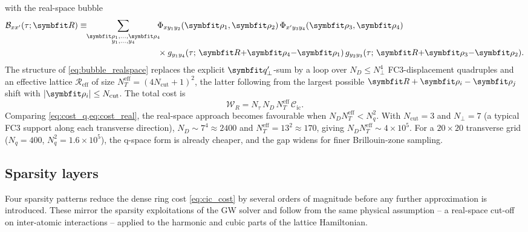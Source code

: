 with the real-space bubble
\begin{equation}\label{eq:bubble_realspace}
\begin{aligned}
  \mathcal{B}_{xx'}(\tau;\vR)
  \equiv
  \!\!\sum_{\substack{\vc{\rho}_1,\ldots,\vc{\rho}_4\\y_1,\ldots,y_4}}\!\!
  &\Phi_{xy_1y_2}(\vc\rho_1,\vc\rho_2)\,
   \Phi_{x'y_3y_4}(\vc\rho_3,\vc\rho_4)\\
  &\times g_{y_1y_4}(\tau;\,\vR{+}\vc\rho_4{-}\vc\rho_1)\,
          g_{y_2y_3}(\tau;\,\vR{+}\vc\rho_3{-}\vc\rho_2).
\end{aligned}
\end{equation}
The structure of \cref{eq:bubble_realspace} replaces the explicit
$\qp'$-sum by a loop over $N_D \le N_\perp^{4}$ FC3-displacement
quadruples and an effective lattice $\mathcal{R}_\mathrm{eff}$ of
size $N_T^\mathrm{eff} = (4 N_\mathrm{cut}+1)^{2}$, the latter
following from the largest possible $\vR + \vc\rho_i - \vc\rho_j$
shift with $|\vc\rho_i|\le N_\mathrm{cut}$. The total cost is
\begin{equation}\label{eq:cost_real}
  \mathcal{W}_R = N_\tau\,N_D\,N_T^\mathrm{eff}\,\mathcal{C}_\mathrm{ic}.
\end{equation}
Comparing \cref{eq:cost_q,eq:cost_real}, the real-space approach
becomes favourable when $N_D N_T^\mathrm{eff} < N_q^{2}$. With
$N_\mathrm{cut} = 3$ and $N_\perp = 7$ (a typical FC3 support along
each transverse direction), $N_D \sim 7^{4} \approx 2400$ and
$N_T^\mathrm{eff} = 13^{2} \approx 170$, giving $N_D N_T^\mathrm{eff}
\sim 4\times 10^{5}$. For a $20\times 20$ transverse grid
($N_q = 400$, $N_q^{2} = 1.6\times 10^{5}$), the q-space form is
already cheaper, and the gap widens for finer Brillouin-zone
sampling.

\subsection{Sparsity layers}
\label{ssec:phph_sparsity}

Four sparsity patterns reduce the dense ring cost
\cref{eq:cic_cost} by several orders of magnitude before any further
approximation is introduced. These mirror the sparsity
exploitations of the GW solver
\cite{vetsch_ab-initio_2025, deuschle_electron-electron_2025} and
follow from the same physical assumption -- a real-space cut-off on
inter-atomic interactions -- applied to the harmonic and cubic
parts of the lattice Hamiltonian.

